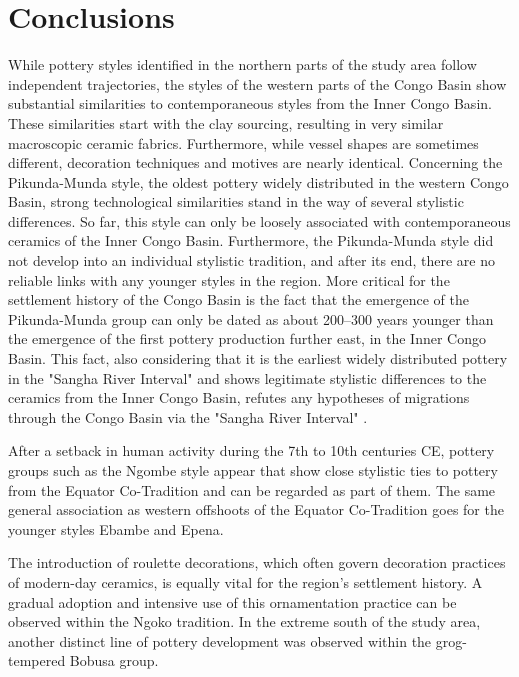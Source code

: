 \documentclass[smallextended,natbib]{svjour3}       %
\begin{document}
\section*{Conclusions}

While pottery styles identified in the northern parts of the study area follow independent trajectories, the styles of the western parts of the Congo Basin show substantial similarities to contemporaneous styles from the Inner Congo Basin. These similarities start with the clay sourcing, resulting in very similar macroscopic ceramic fabrics. Furthermore, while vessel shapes are sometimes different, decoration techniques and motives are nearly identical. Concerning the Pikunda-Munda style, the oldest pottery widely distributed in the western Congo Basin, strong technological similarities stand in the way of several stylistic differences. So far, this style can only be loosely associated with contemporaneous ceramics of the Inner Congo Basin. Furthermore, the Pikunda-Munda style did not develop into an individual stylistic tradition, and after its end, there are no reliable links with any younger styles in the region. More critical for the settlement history of the Congo Basin is the fact that the emergence of the Pikunda-Munda group can only be dated as about 200--300 years younger than the emergence of the first pottery production further east, in the Inner Congo Basin. This fact, also considering that it is the earliest widely distributed pottery in the "Sangha River Interval" and shows legitimate stylistic differences to the ceramics from the Inner Congo Basin, refutes any hypotheses of migrations through the Congo Basin via the "Sangha River Interval" \citep{Bostoen.2015,Grollemund.2015,Grollemund.2023}.

After a setback in human activity during the 7th to 10th centuries CE, pottery groups such as the Ngombe style appear that show close stylistic ties to pottery from the Equator Co-Tradition and can be regarded as part of them. The same general association as western offshoots of the Equator Co-Tradition goes for the younger styles Ebambe and Epena.

The introduction of roulette decorations, which often govern decoration practices of modern-day ceramics, is equally vital for the region's settlement history. A gradual adoption and intensive use of this ornamentation practice can be observed within the Ngoko tradition. In the extreme south of the study area, another distinct line of pottery development was observed within the grog-tempered Bobusa group.
\end{document}
